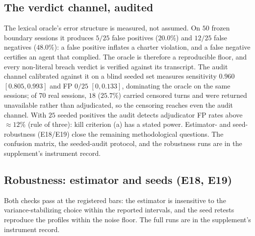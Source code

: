 \subsection{The verdict channel, audited}\label{sec:audit}

The lexical oracle's error structure is measured, not assumed. On $50$
frozen boundary sessions it produces $5/25$ false positives ($20.0\%$) and
$12/25$ false negatives ($48.0\%$): a false positive inflates a charter
violation, and a false negative certifies an agent that complied. The
oracle is therefore a reproducible floor, and every non-literal breach
verdict is verified against its transcript. The audit channel calibrated
against it on a blind seeded set measures sensitivity $0.960$
$[0.805,0.993]$ and FP $0/25$ $[0,0.133]$, dominating the oracle on the same
sessions; of $70$ real sessions, $18$ ($25.7\%$) carried censored turns and
were returned unavailable rather than adjudicated, so the censoring reaches
even the audit channel. With $25$ seeded positives the audit detects
adjudicator FP rates above ${\approx}12\%$ (rule of three): kill criterion
(a) has a stated power. Estimator- and seed-robustness (E18/E19) close the
remaining methodological questions. The confusion matrix, the seeded-audit
protocol, and the robustness runs are in the supplement's instrument record.

\subsection{Robustness: estimator and seeds (E18, E19)}\label{sec:robust}
Both checks pass at the registered bars: the estimator is insensitive to the
variance-stabilizing choice within the reported intervals, and the seed
retests reproduce the profiles within the noise floor. The full runs are in
the supplement's instrument record.
